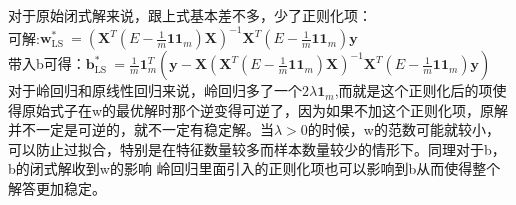 \documentclass[answers]{exam}  %
\begin{document}
\begin{questions}
\begin{solution}
\begin{parts}
        对于原始闭式解来说，跟上式基本差不多，少了正则化项：\\
        可解:$\boldsymbol{w}_{\text {LS }}^* = (\boldsymbol{X}^T (E - \frac{1}{m}\boldsymbol{1}\boldsymbol{1}_m) \boldsymbol{X})^{-1} \boldsymbol{X}^T (E - \frac{1}{m}\boldsymbol{1}\boldsymbol{1}_m) \boldsymbol{y}$\\
        带入b可得：$\boldsymbol{b}_{\text {LS }}^* = \frac{1}{m} \boldsymbol{1}_m^T (\boldsymbol{y} - \boldsymbol{X} (\boldsymbol{X}^T (E - \frac{1}{m}\boldsymbol{1}\boldsymbol{1}_m) \boldsymbol{X})^{-1} \boldsymbol{X}^T (E - \frac{1}{m}\boldsymbol{1}\boldsymbol{1}_m) \boldsymbol{y})$\\

        对于岭回归和原线性回归来说，岭回归多了一个$2\lambda\boldsymbol{1}_m$,而就是这个正则化后的项使得原始式子在w的最优解时那个逆变得可逆了，因为如果不加这个正则化项，原解
        并不一定是可逆的，就不一定有稳定解。当$\lambda > 0$的时候，w的范数可能就较小，可以防止过拟合，特别是在特征数量较多而样本数量较少的情形下。同理对于b，b的闭式解收到w的影响
        岭回归里面引入的正则化项也可以影响到b从而使得整个解答更加稳定。

\end{parts}
\end{solution}
\end{questions}
\end{document}
